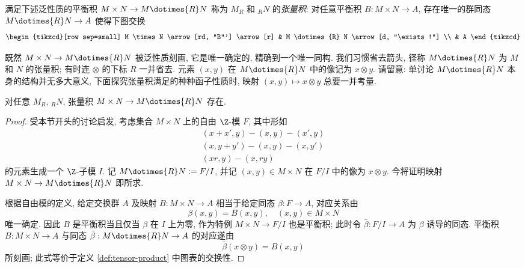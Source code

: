 \begin{definition}\label{def:tensor-product}
	满足下述泛性质的平衡积 $M \times N \to M \dotimes{R} N$ 称为 $M_R$ 和 ${}_R N$ 的\emph{张量积}: 对任意平衡积 $B: M \times N \to A$, 存在唯一的群同态 $M \dotimes{R} N \to A $ 使得下图交换
	\[ \begin{tikzcd}[row sep=small]
		M \times N \arrow[rd, "B"'] \arrow[r] & M \dotimes{R} N \arrow[d, "\exists!"] \\
		& A
	\end{tikzcd} \]
\end{definition}
既然 $M \times N \to M \dotimes{R} N$ 被泛性质刻画, 它是唯一确定的, 精确到一个唯一同构. 我们习惯省去箭头, 径称 $M \dotimes{R} N$ 为 $M$ 和 $N$ 的张量积; 有时连 $\otimes$ 的下标 $R$ 一并省去. 元素 $(x, y)$ 在 $M \dotimes{R} N$ 中的像记为 $x \otimes y$. 请留意: 单讨论 $M \dotimes{R} N$ 本身的结构并无多大意义, 下面探究张量积满足的种种函子性质时, 映射 $(x, y) \mapsto x \otimes y$ 总要一并考量.

\begin{lemma}
	对任意 $M_R$, ${}_R N$, 张量积 $M \times N \to M \dotimes{R} N$ 存在.
\end{lemma}
\begin{proof}
	受本节开头的讨论启发, 考虑集合 $M \times N$ 上的自由 $\Z$-模 $F$, 其中形如
	\begin{gather*}
		(x + x', y) - (x, y) - (x', y) \\
		(x, y + y') - (x, y) - (x, y') \\
		(xr, y) - (x, ry)
	\end{gather*}
	的元素生成一个 $\Z$-子模 $I$. 记 $M \dotimes{R} N := F/I$, 并记 $(x,y) \in M \times N$ 在 $F/I$ 中的像为 $x \otimes y$. 今将证明映射 $M \times N \to M \dotimes{R} N$ 即所求.

	根据自由模的定义, 给定交换群 $A$ 及映射 $B: M \times N \to A$ 相当于给定同态 $\beta: F \to A$, 对应关系由
	\[ \beta(x,y) = B(x,y), \quad (x,y) \in M \times N \]
	唯一确定. 因此 $B$ 是平衡积当且仅当 $\beta$ 在 $I$ 上为零, 作为特例 $M \times N \to F/I$ 也是平衡积; 此时令 $\bar{\beta}: F/I \to A$ 为 $\beta$ 诱导的同态. 平衡积 $B: M \times N \to A$ 与同态 $\bar{\beta}: M \dotimes{R} N \to A$ 的对应遂由
	\[ \bar{\beta}(x \otimes y) = B(x,y) \]
	所刻画; 此式等价于定义 \ref{def:tensor-product} 中图表的交换性.
\end{proof}

